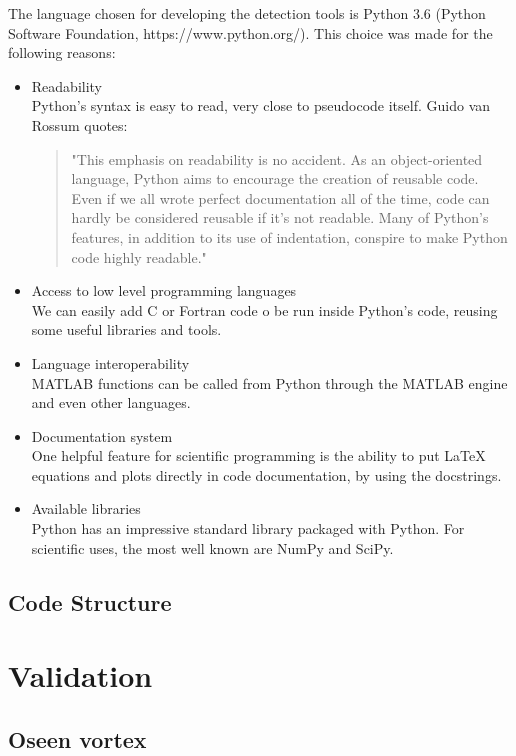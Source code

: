 \documentclass[12pt, a4paper, openany]{memoir}
\begin{document}
The language chosen for developing the detection tools is Python 3.6 (Python Software Foundation, https://www.python.org/). This choice was made for the following reasons:
\begin{itemize}
	\item Readability \\
	Python's syntax is easy to read, very close to pseudocode itself. Guido van Rossum quotes:
	\begin{quote}
		"This emphasis on readability is no accident. As an object-oriented language, Python aims to encourage the creation of reusable code. Even if we all wrote perfect documentation all of the time, code can hardly be considered reusable if it’s not readable. Many of Python’s features, in addition to its use of indentation, conspire to make Python code highly readable."
	\end{quote}
	\item Access to low level programming languages \\
	We can easily add C or Fortran code o be run inside Python's code, reusing some useful libraries and tools.
	\item Language interoperability \\
	MATLAB functions can be called from Python through the MATLAB engine and even other languages.
	\item Documentation system \\
	One helpful feature for scientific programming is the ability to put LaTeX equations and plots directly in code documentation, by using the docstrings.
	\item Available libraries \\
	Python has an impressive standard library packaged with Python. For scientific uses, the most well known are NumPy and SciPy.
\end{itemize} 

\section{Code Structure}

\chapter{Validation}

\section{Oseen vortex}
\end{document}
